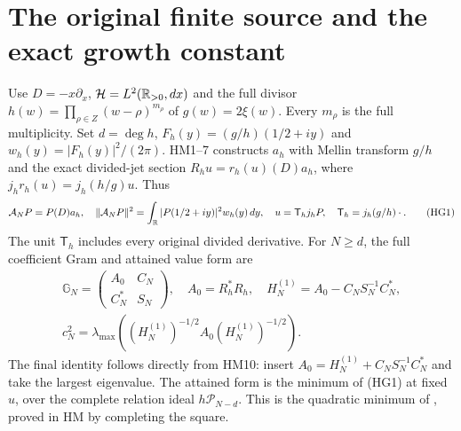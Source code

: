\documentclass[11pt]{article}
\begin{document}
\section{The original finite source and the exact growth constant}
Use $D=-x\partial_x$, $\mathcal H=L^2(\mathbb R_{>0},dx)$ and the full divisor
$h(w)=\prod_{\rho\in Z}(w-\rho)^{m_\rho}$ of $g(w)=2\xi(w)$.
Every $m_\rho$ is the full multiplicity. Set $d=\deg h$,
$F_h(y)=(g/h)(1/2+iy)$ and $w_h(y)=|F_h(y)|^2/(2\pi)$.
HM1--7 \cite{hg:HM} constructs $a_h$ with Mellin transform $g/h$ and
the exact divided-jet section $R_hu=r_h(u)(D)a_h$, where
$j_hr_h(u)=j_h(h/g)u$. Thus
\[
 \mathcal A_NP=P(D)a_h,\quad
 \|\mathcal A_NP\|^2=\int_\mathbb R|P(1/2+iy)|^2w_h(y)\,dy,
 \quad u=\mathsf T_hj_hP,\quad \mathsf T_h=j_h(g/h)\cdot .\tag{HG1}
\]
The unit $\mathsf T_h$ includes every original divided derivative.
For $N\ge d$, the full coefficient Gram and attained value form are
\[
\begin{gathered}
 \mathbb G_N=\begin{pmatrix}A_0&C_N\\C_N^*&S_N\end{pmatrix},\quad
 A_0=R_h^*R_h,\quad H_N^{(1)}=A_0-C_NS_N^{-1}C_N^*,
 \\
 c_N^2=\lambda_{\max}((H_N^{(1)})^{-1/2}A_0(H_N^{(1)})^{-1/2}).
\end{gathered}
 \tag{HG2}
\]
The final identity follows directly from HM10: insert
$A_0=H_N^{(1)}+C_NS_N^{-1}C_N^*$ and take the largest eigenvalue.
The attained form is the minimum of (HG1) at fixed $u$, over the complete
relation ideal $h\mathcal P_{N-d}$. This is the quadratic minimum of
\cite[Appendix C.4.1]{hg:Boyd}, proved in HM by completing the square.
\end{document}
